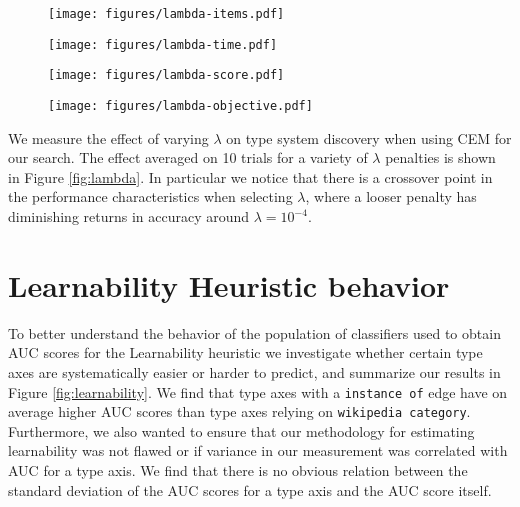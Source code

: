 \documentclass[letterpaper]{article}
\begin{document}
\begin{figure*}[ht]
\centering
\begin{subfigure}{0.24\linewidth}
    \texttt{[image: figures/lambda-items.pdf]}
    \caption{}
    \end{subfigure}
    \begin{subfigure}{0.24\linewidth}
    \texttt{[image: figures/lambda-time.pdf]}
    \caption{}
    \end{subfigure}
    \begin{subfigure}{0.24\linewidth}
    \texttt{[image: figures/lambda-score.pdf]}
    \caption{}
    \end{subfigure}
    \begin{subfigure}{0.24\linewidth}
    \texttt{[image: figures/lambda-objective.pdf]}
    \caption{}
    \end{subfigure}
    \caption{Effect of varying $\lambda$ on CEM type system discovery: Solution size (a) and iterations to convergence (b) grow exponentially with penalty decrease, while accuracy plateaus (c) around $\lambda=10^{-4}$. Objective function increases as penalty decreases, since solution size is less penalized (d). Standard deviation is shown as the red region around the mean.}
    \label{fig:lambda}
\end{figure*}

We measure the effect of varying $\lambda$ on type system discovery when using CEM for our search. The effect averaged on 10 trials for a variety of $\lambda$ penalties is shown in Figure \ref{fig:lambda}. In particular we notice that there is a crossover point in the performance characteristics when selecting $\lambda$, where a looser penalty has diminishing returns in accuracy around $\lambda=10^{-4}$.

\section{Learnability Heuristic behavior}
To better understand the behavior of the population of classifiers used to obtain AUC scores for the Learnability heuristic we investigate whether certain type axes are systematically easier or harder to predict, and summarize our results in Figure \ref{fig:learnability}. We find that type axes with a \texttt{instance of} edge have on average higher AUC scores than type axes relying on \texttt{wikipedia category}. Furthermore, we also wanted to ensure that our methodology for estimating learnability was not flawed or if variance in our measurement was correlated with AUC for a type axis. We find that there is no obvious relation between the standard deviation of the AUC scores for a type axis and the AUC score itself.
\end{document}
